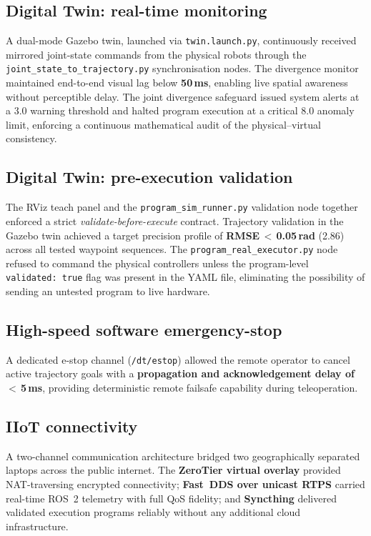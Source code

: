 \subsection{Digital Twin: real-time monitoring}
A dual-mode Gazebo twin, launched via \texttt{twin.launch.py}, continuously received mirrored
joint-state commands from the physical robots through the \texttt{joint\_\allowbreak state\_\allowbreak to\_\allowbreak trajectory.py}
synchronisation nodes.  The divergence monitor maintained end-to-end visual lag below
\textbf{50\,ms}, enabling live spatial awareness without perceptible delay.  The joint divergence
safeguard issued system alerts at a 3.0\textdegree{} warning threshold and halted program
execution at a critical 8.0\textdegree{} anomaly limit, enforcing a continuous mathematical
audit of the physical--virtual consistency.

\subsection{Digital Twin: pre-execution validation}
The RViz teach panel and the \texttt{program\_\allowbreak sim\_\allowbreak runner.py} validation node together enforced
a strict \emph{validate-before-execute} contract.  Trajectory validation in the Gazebo twin
achieved a target precision profile of \textbf{RMSE\,$<$\,0.05\,rad} (2.86\textdegree{}) across
all tested waypoint sequences.  The \texttt{program\_\allowbreak real\_\allowbreak executor.py} node refused to command
the physical controllers unless the program-level \texttt{validated:~true} flag was present in
the YAML file, eliminating the possibility of sending an untested program to live hardware.

\subsection{High-speed software emergency-stop}
A dedicated e-stop channel (\texttt{/dt/estop}) allowed the remote operator to cancel active
trajectory goals with a \textbf{propagation and acknowledgement delay of $<$\,5\,ms},
providing deterministic remote failsafe capability during teleoperation.

\subsection{IIoT connectivity}
A two-channel communication architecture bridged two geographically separated laptops across
the public internet.  The \textbf{ZeroTier virtual overlay} provided NAT-traversing encrypted
connectivity; \textbf{Fast~DDS over unicast RTPS} carried real-time ROS~2 telemetry
with full QoS fidelity; and \textbf{Syncthing} delivered validated execution programs reliably
without any additional cloud infrastructure.

